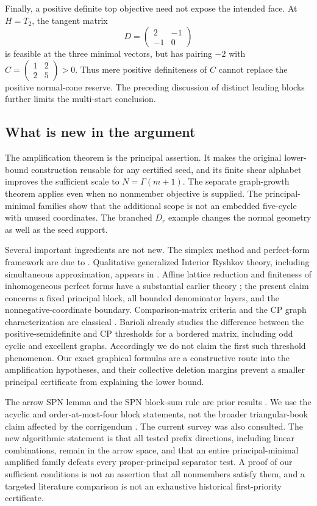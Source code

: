 \documentclass[11pt]{article}
\theoremstyle{definition}\newtheorem{definition}[theorem]{Definition}
\theoremstyle{remark}\newtheorem{remark}[theorem]{Remark}
\begin{document}
Finally, a positive definite top objective need not expose the intended face. At $H=T_2$, the tangent matrix
\[
 D=\begin{pmatrix}2&-1\\-1&0\end{pmatrix}
\]
is feasible at the three minimal vectors, but has pairing $-2$ with
$C=\left(\begin{smallmatrix}1&2\\2&5\end{smallmatrix}\right)>0$.
Thus mere positive definiteness of $C$ cannot replace the positive normal-cone reserve. The preceding discussion of distinct leading blocks further limits the multi-start conclusion.

\subsection{What is new in the argument}
The amplification theorem is the principal assertion. It makes the original lower-bound construction reusable for any certified seed, and its finite shear alphabet improves the sufficient scale to $N=\Gamma(m+1)$. The separate graph-growth theorem applies even when no nonmember objective is supplied. The principal-minimal families show that the additional scope is not an embedded five-cycle with unused coordinates. The branched $D_r$ example changes the normal geometry as well as the seed support.

Several important ingredients are not new. The simplex method and perfect-form framework are due to \cite{DSV,DS}. Qualitative generalized Interior Ryshkov theory, including simultaneous approximation, appears in \cite{OS}. Affine lattice reduction and finiteness of inhomogeneous perfect forms have a substantial earlier theory \cite{Inhom}; the present claim concerns a fixed principal block, all bounded denominator layers, and the nonnegative-coordinate boundary. Comparison-matrix criteria and the CP graph characterization are classical \cite{Drew,Kogan}. Barioli \cite{Barioli} already studies the difference between the positive-semidefinite and CP thresholds for a bordered matrix, including odd cyclic and excellent graphs. Accordingly we do not claim the first such threshold phenomenon. Our exact graphical formulas are a constructive route into the amplification hypotheses, and their collective deletion margins prevent a smaller principal certificate from explaining the lower bound.

The arrow SPN lemma and the SPN block-sum rule are prior results \cite{SPN}. We use the acyclic and order-at-most-four block statements, not the broader triangular-book claim affected by the corrigendum \cite{SPNcorr}. The current survey \cite{SPNsurvey} was also consulted. The new algorithmic statement is that all tested prefix directions, including linear combinations, remain in the arrow space, and that an entire principal-minimal amplified family defeats every proper-principal separator test. A proof of our sufficient conditions is not an assertion that all nonmembers satisfy them, and a targeted literature comparison is not an exhaustive historical first-priority certificate.
\end{document}

